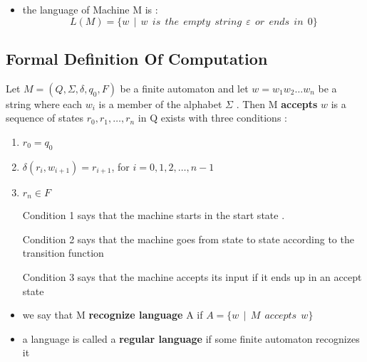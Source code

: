 \documentclass[12pt]{article}
\let\epsilon\varepsilon
\begin{document}
\begin{tcolorbox}
\begin{itemize}
	\item the language of Machine M is :
	$$
	L(M) = \{ w \:\: | \:\: w \:\: is \:\: the \:\: empty \:\: string \:\: \epsilon \:\: or \:\: ends \:\: in \:\: 0 \}
	$$
\end{itemize}
\end{tcolorbox}



\subsection{Formal Definition Of Computation}

Let $M=(Q , \Sigma , \delta , q_{0} , F)$ be a finite automaton and let $w = w_{1}w_{2} \dots w_{n}$ be a string where each $w_{i}$ is a member of the alphabet $\Sigma$ . Then M \textbf{accepts} $w$ is a sequence of states $r_{0}, r_{1} , \dots , r_{n}$ in Q exists with three conditions :


\begin{enumerate}
	\item $r_{0} = q_{0}$
	\item $\delta(r_{i} , w_{i+1}) = r_{i+1}$, for $i = 0 , 1 , 2 , \dots , n-1$
	\item $r_{n} \in F$
\end{enumerate}


\begin{itemize}
	\item [Condition 1] says that the machine starts in the start state .
	\item [Condition 2] says that the machine goes from state to state according to the transition function
	\item [Condition 3] says that the machine accepts its input if it ends up in an accept state
	\item we say that M \textbf{recognize language} A if 
	$A = \{ w \:\: | \:\: M \:\: accepts \:\: w \}$
\end{itemize}



\begin{tcolorbox}
\begin{itemize}
	\item a language is called a \textbf{regular language} if some finite automaton recognizes it
\end{itemize}
\end{tcolorbox}
\end{document}

